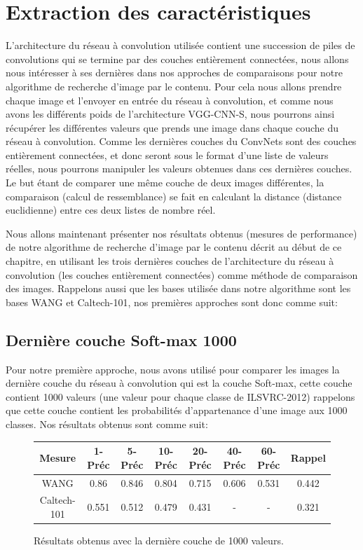 \section{Extraction des caractéristiques}
	L'architecture du réseau à convolution utilisée contient une succession de piles de convolutions qui se termine par des couches entièrement connectées, nous allons nous intéresser à ses dernières dans nos approches de comparaisons pour notre algorithme de recherche d'image par le contenu.
	Pour cela nous allons prendre chaque image et l'envoyer en entrée du réseau à convolution, et comme nous avons les différents poids de l'architecture VGG-CNN-S, nous pourrons ainsi récupérer les différentes valeurs que prends une image dans chaque couche du réseau à convolution. Comme les dernières couches du ConvNets sont des couches entièrement connectées, et donc seront sous le format d'une liste de valeurs réelles, nous pourrons manipuler les valeurs obtenues dans ces dernières couches. Le but étant de comparer une même couche de deux images différentes, la comparaison (calcul de ressemblance) se fait en calculant la distance (distance euclidienne) entre ces deux listes de nombre réel.
	
	Nous allons maintenant présenter nos résultats obtenus (mesures de performance) de notre algorithme de recherche d'image par le contenu décrit au début de ce chapitre, en utilisant les trois dernières couches de l'architecture du réseau à convolution (les couches entièrement connectées) comme méthode de comparaison des images. Rappelons aussi que les bases utilisée dans notre algorithme sont les bases WANG et Caltech-101, nos premières approches sont donc comme suit:

\subsection{Dernière couche Soft-max 1000}
	Pour notre première approche, nous avons utilisé pour comparer les images la dernière couche du réseau à convolution qui est la couche Soft-max, cette couche contient 1000 valeurs (une valeur pour chaque classe de ILSVRC-2012) rappelons que cette couche contient les probabilités d'appartenance d'une image aux 1000 classes. Nos résultats obtenus sont comme suit:	

\begin{figure}[H]
\begin{center}
\begin{tabular}{|c|c|c|c|c|c|c|c|}
\hline
	Mesure & 1-Préc & 5-Préc & 10-Préc & 20-Préc & 40-Préc & 60-Préc & Rappel\\
\hline
	WANG & 0.86 & 0.846 & 0.804 & 0.715 & 0.606 & 0.531 & 0.442\\
\hline
	Caltech-101 & 0.551 & 0.512 & 0.479 & 0.431 & - & - & 0.321\\
\hline
\end{tabular}
\end{center}
\caption{Résultats obtenus avec la dernière couche de 1000 valeurs.}
\end{figure}

